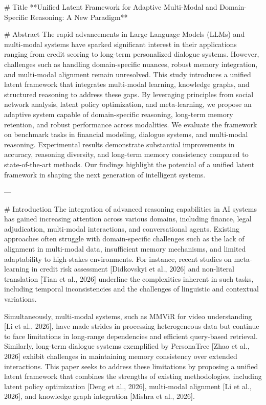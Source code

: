 # Title  
**Unified Latent Framework for Adaptive Multi-Modal and Domain-Specific Reasoning: A New Paradigm**

# Abstract  
The rapid advancements in Large Language Models (LLMs) and multi-modal systems have sparked significant interest in their applications ranging from credit scoring to long-term personalized dialogue systems. However, challenges such as handling domain-specific nuances, robust memory integration, and multi-modal alignment remain unresolved. This study introduces a unified latent framework that integrates multi-modal learning, knowledge graphs, and structured reasoning to address these gaps. By leveraging principles from social network analysis, latent policy optimization, and meta-learning, we propose an adaptive system capable of domain-specific reasoning, long-term memory retention, and robust performance across modalities. We evaluate the framework on benchmark tasks in financial modeling, dialogue systems, and multi-modal reasoning. Experimental results demonstrate substantial improvements in accuracy, reasoning diversity, and long-term memory consistency compared to state-of-the-art methods. Our findings highlight the potential of a unified latent framework in shaping the next generation of intelligent systems.

---

# Introduction  
The integration of advanced reasoning capabilities in AI systems has gained increasing attention across various domains, including finance, legal adjudication, multi-modal interactions, and conversational agents. Existing approaches often struggle with domain-specific challenges such as the lack of alignment in multi-modal data, insufficient memory mechanisms, and limited adaptability to high-stakes environments. For instance, recent studies on meta-learning in credit risk assessment [Didkovskyi et al., 2026] and non-literal translation [Tian et al., 2026] underline the complexities inherent in such tasks, including temporal inconsistencies and the challenges of linguistic and contextual variations.

Simultaneously, multi-modal systems, such as MMViR for video understanding [Li et al., 2026], have made strides in processing heterogeneous data but continue to face limitations in long-range dependencies and efficient query-based retrieval. Similarly, long-term dialogue systems exemplified by PersonaTree [Zhao et al., 2026] exhibit challenges in maintaining memory consistency over extended interactions. This paper seeks to address these limitations by proposing a unified latent framework that combines the strengths of existing methodologies, including latent policy optimization [Deng et al., 2026], multi-modal alignment [Li et al., 2026], and knowledge graph integration [Mishra et al., 2026].

